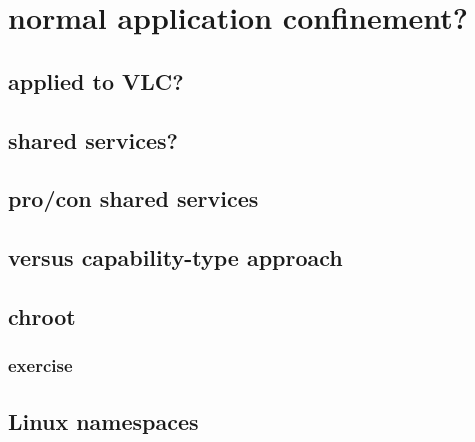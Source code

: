 \section{normal application confinement?}



\subsection{applied to VLC?}


\subsection{shared services?}


\subsection{pro/con shared services}



\subsection{versus capability-type approach}


\subsection{chroot}


\subsubsection{exercise}


\subsection{Linux namespaces}




